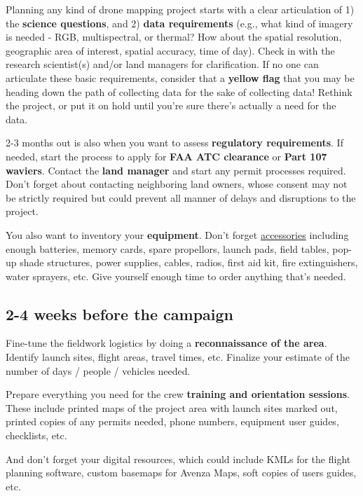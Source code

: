 \documentclass[
]{book}
\begin{document}
Planning any kind of drone mapping project starts with a clear articulation of 1) the \textbf{science questions}, and 2) \textbf{data requirements} (e.g., what kind of imagery is needed - RGB, multispectral, or thermal? How about the spatial resolution, geographic area of interest, spatial accuracy, time of day). Check in with the research scientist(s) and/or land managers for clarification. If no one can articulate these basic requirements, consider that a \textbf{yellow flag} that you may be heading down the path of collecting data for the sake of collecting data! Rethink the project, or put it on hold until you're sure there's actually a need for the data.

2-3 months out is also when you want to assess \textbf{regulatory requirements}. If needed, start the process to apply for \textbf{FAA ATC clearance} or \textbf{Part 107 waviers}. Contact the \textbf{land manager} and start any permit processes required. Don't forget about contacting neighboring land owners, whose consent may not be strictly required but could prevent all manner of delays and disruptions to the project.

You also want to inventory your \textbf{equipment}. Don't forget \protect\hyperlink{accessories}{accessories} including enough batteries, memory cards, spare propellors, launch pads, field tables, pop-up shade structures, power supplies, cables, radios, first aid kit, fire extinguishers, water sprayers, etc. Give yourself enough time to order anything that's needed.

\hypertarget{weeks-before-the-campaign}{%
\subsection{2-4 weeks before the campaign}\label{weeks-before-the-campaign}}

Fine-tune the fieldwork logistics by doing a \textbf{reconnaissance of the area}. Identify launch sites, flight areas, travel times, etc. Finalize your estimate of the number of days / people / vehicles needed.

Prepare everything you need for the crew \textbf{training and orientation sessions}. These include printed maps of the project area with launch sites marked out, printed copies of any permits needed, phone numbers, equipment user guides, checklists, etc.

And don't forget your digital resources, which could include KMLs for the flight planning software, custom basemaps for Avenza Maps, soft copies of users guides, etc.
\end{document}

